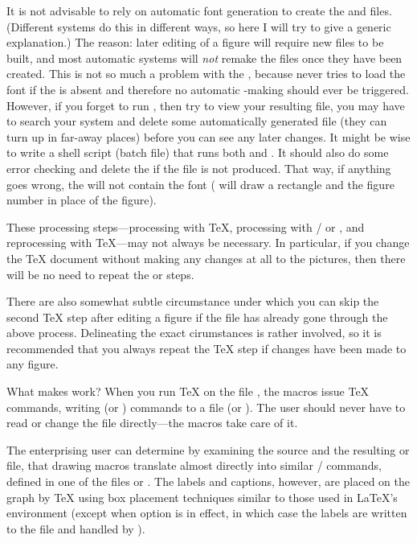 \documentclass[letterpaper]{article}
\begin{document}
It is not advisable to rely on automatic font generation to create the
 and  files. (Different systems do this in
different ways, so here I will try to give a generic explanation.) The
reason: later editing of a figure will require new files to be built,
and most automatic systems will \emph{not} remake the files once they
have been created. This is not so much a problem with the ,
because \mfp{} never tries to load the font if the  is absent
and therefore no automatic -making should ever be triggered.
However, if you forget to run , then try to view your
resulting file, you may have to search your system and delete some
automatically generated  file (they can turn up in far-away
places) before you can see any later changes. It might be wise to write
a shell script (batch file) that runs both \MF{} and . It
should also do some error checking and delete the  if the
 file is not produced. That way, if anything goes wrong, the
 will not contain the font (\mfp{} will draw a rectangle and
the figure number in place of the figure).

These processing steps---processing with \TeX{}, processing with
\MF{}\slash{} or \MP{}, and reprocessing with \TeX{}---may not always be
necessary. In particular, if you change the \TeX{} document without
making any changes at all to the pictures, then there will be no need to
repeat the \MF{} or \MP{} steps.

There are also somewhat subtle circumstance under which you can skip the
second \TeX{} step after editing a figure if the file  has already gone
through the above process. Delineating the exact cirumstances is rather
involved, so it is recommended that you always repeat the \TeX{} step if
changes have been made to any figure.

What makes \mfp{} work? When you run \TeX{} on the file
, the \mfp{} macros issue \TeX{}  commands,
writing \MF{} (or \MP{}) commands to a file  (or
).  The user should never have to read or change the file
 directly---the \mfp{} macros take care of it.

The enterprising user can determine by examining the \mfp{} source and
the resulting  or  file, that \mfp{} drawing macros
translate almost directly into similar \MF{}\slash\MP{} commands,
defined in one of the files  or .
The labels and captions, however, are placed on the graph by \TeX{}
using box placement techniques similar to those used in \LaTeX{}'s
 environment (except when option  is in
effect, in which case the labels are written to the  file and
handled by \MP{}).
\end{document}
